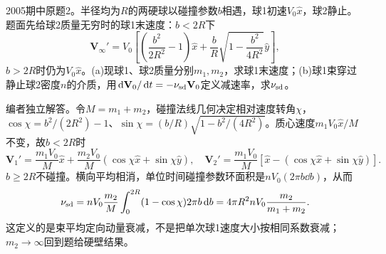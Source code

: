 \begin{exercise}\label{ex:hist05-mid-2}
2005期中原题2。半径均为$R$的两硬球以碰撞参数$b$相遇，球1初速$V_0\hat x$，球2静止。题面先给球2质量无穷时的球1末速度：$b<2R$下
\begin{equation}\mathbf V_{\infty}'=V_0\left[\left(\frac{b^2}{2R^2}-1\right)\hat x+\frac bR\sqrt{1-\frac{b^2}{4R^2}}\hat y\right],\end{equation}
$b>2R$时仍为$V_0\hat x$。(a)现球1、球2质量分别$m_1,m_2$，求球1末速度；(b)球1束穿过静止球2密度$n$的介质，用$\,\mathrm d\mathbf V_0/\,\mathrm d t=-\nu_{\rm sd}\mathbf V_0$定义减速率，求$\nu_{\rm sd}$。
\end{exercise}
\begin{solution}
编者独立解答。令$M=m_1+m_2$，碰撞法线几何决定相对速度转角$\chi$，$\cos\chi=b^2/(2R^2)-1$、$\sin\chi=(b/R)\sqrt{1-b^2/(4R^2)}$。质心速度$m_1V_0\hat x/M$不变，故$b<2R$时
\begin{equation}
\mathbf V_1'=\frac{m_1V_0}{M}\hat x+\frac{m_2V_0}{M}(\cos\chi\hat x+\sin\chi\hat y),
\quad
\mathbf V_2'=\frac{m_1V_0}{M}[\hat x-(\cos\chi\hat x+\sin\chi\hat y)].
\end{equation}
$b\ge2R$不碰撞。横向平均相消，单位时间碰撞参数环面积是$nV_0(2\pi b\dd b)$，从而
\begin{equation}
\nu_{\rm sd}=nV_0\frac{m_2}{M}\int_0^{2R}(1-\cos\chi)2\pi b\,\mathrm d b
=4\pi R^2 nV_0\frac{m_2}{m_1+m_2}.
\end{equation}
这定义的是束平均定向动量衰减，不是把单次球1速度大小按相同系数衰减；$m_2\to\infty$回到题给硬壁结果。
\end{solution}

